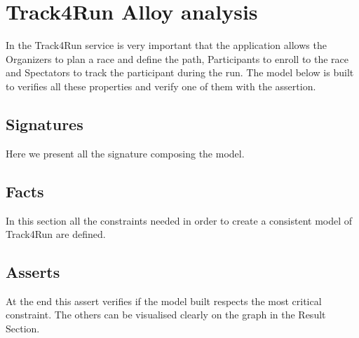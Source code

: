 \section{Track4Run Alloy analysis}

    In the Track4Run service is very important that the application allows the Organizers to plan a race and define the path, Participants to enroll to the race and Spectators to track the participant during the run. The model below is built to verifies all these properties and verify one of them with the assertion.

    \subsection{Signatures}
        
        Here we present all the signature composing the model.
        
        
    
    \subsection{Facts}
 
        In this section all the constraints needed in order to create a consistent model of Track4Run are defined.
    
        

    \subsection{Asserts}
    
        At the end this assert verifies if the model built respects the most critical constraint. The others can be visualised clearly on the graph in the Result Section.
    
        